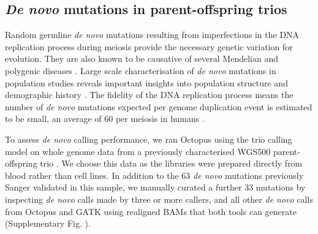 \documentclass[notitlepage, twocolumn]{article}
\begin{document}
\subsection*{\textit{De novo} mutations in parent-offspring trios}

Random germline \textit{de novo} mutations resulting from imperfections in the DNA replication process during meiosis provide the necessary genetic variation for evolution. They are also known to be causative of several Mendelian and polygenic diseases \cite{RN157, RN160, RN159}. Large scale characterisation of \textit{de novo} mutations in population studies reveals important insights into population structure and demographic history \cite{RN158}. The fidelity of the DNA replication process means the number of \textit{de novo} mutations expected per genome duplication event is estimated to be small, an average of 60 per meiosis in humans \cite{RN6}.

To assess \textit{de novo} calling performance, we ran Octopus using the trio calling model on whole genome data from a previously characterised WGS500 parent-offspring trio \cite{RN5}. We choose this data as the libraries were prepared directly from blood rather than cell lines. In addition to the $63$ \textit{de novo} mutations previously Sanger validated in this sample, we manually curated a further $33$ mutations by inspecting \textit{de novo} calls made by three or more callers, and all other \textit{de novo} calls from Octopus and GATK using realigned BAMs that both tools can generate (Supplementary Fig. ).

\begin{table}[hb!]
    \centering
    \caption{\textit{De novo} mutations called in WGS500 trio.}
    \label{table:denovo}
    \small
    \sffamily
\end{table}
\end{document}
